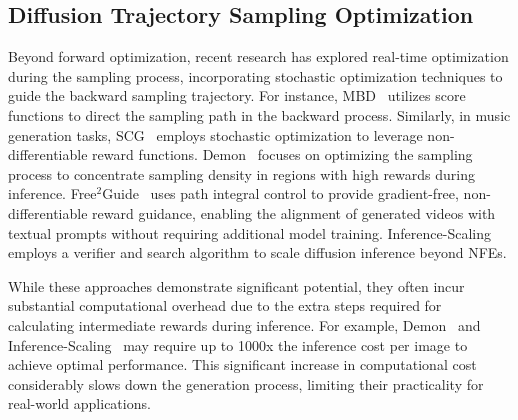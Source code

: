 \subsection{Diffusion Trajectory Sampling Optimization}
Beyond forward optimization, recent research has explored real-time optimization during the sampling process, incorporating stochastic optimization techniques to guide the backward sampling trajectory. For instance, MBD~\citep{pan2024modelbased} utilizes score functions to direct the sampling path in the backward process. Similarly, in music generation tasks, SCG~\citep{huang2024symbolic} employs stochastic optimization to leverage non-differentiable reward functions. Demon~\citep{yeh2024training} focuses on optimizing the sampling process to concentrate sampling density in regions with high rewards during inference. Free$^{2}$Guide~\citep{kim2024free} uses path integral control to provide gradient-free, non-differentiable reward guidance, enabling the alignment of generated videos with textual prompts without requiring additional model training. Inference-Scaling~\citep{ma2025inference} employs a verifier and search algorithm to scale diffusion inference beyond NFEs.  

While these approaches demonstrate significant potential, they often incur substantial computational overhead due to the extra steps required for calculating intermediate rewards during inference. For example, Demon~\citep{yeh2024training} and Inference-Scaling~\citep{ma2025inference} may require up to 1000x the inference cost per image to achieve optimal performance. This significant increase in computational cost considerably slows down the generation process, limiting their practicality for real-world applications.